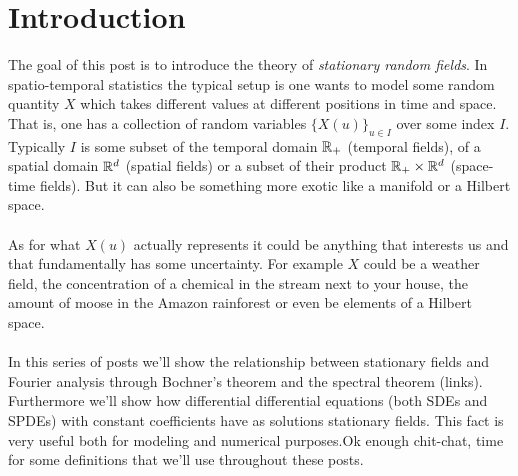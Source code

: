 \documentclass[12pt]{article}
\begin{document}
\section{Introduction}

The goal of this post is to introduce the theory of \emph{stationary random fields}. In spatio-temporal statistics the typical setup is one wants to model some random quantity $X$ which takes
different values at different positions in time and space. That is, one has a collection of random variables $\{X(u)\}_{u\in I}$ over some index $I$. Typically  $I$ is some subset
of the temporal domain ${\mathbb R}_+$ (temporal fields), of a spatial domain ${\mathbb R}^d$ (spatial fields) or a subset of their product ${\mathbb R}_+\times{\mathbb R}^d$ (space-time fields). But it can also be something more exotic like
a manifold or a Hilbert space.
\\\\
As for what $X(u)$ actually represents it could be anything
that interests us and that fundamentally has some uncertainty. For example  $X$ could be a weather field, the concentration of a chemical in the stream next to your house, the amount of moose in the
Amazon rainforest or even be elements of a Hilbert space. \\
\\
In this series of posts we'll show the relationship between stationary fields and Fourier analysis through Bochner's theorem and the spectral theorem (links). Furthermore we'll show how differential differential equations (both SDEs and SPDEs) with constant coefficients have as solutions stationary fields. This fact is very useful both for modeling and numerical purposes.Ok enough chit-chat, time for some definitions that we'll use throughout these posts.
\end{document}
